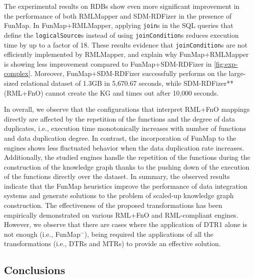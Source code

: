 The experimental results on RDBs show even more significant improvement in the performance of both RMLMapper and SDM-RDFizer in the presence of FunMap. In FunMap+RMLMapper, applying \verb|join|s in the SQL queries that define the \verb|logicalSource|s instead of using \verb|joinCondition|s reduces execution time by up to a factor of 18. These results evidence that \verb|joinCondition|s are not efficiently implemented by RMLMapper, and explain why FunMap+RMLMapper is showing less improvement compared to FunMap+SDM-RDFizer in \autoref{fig:exp-complex}. Moreover, FunMap+SDM-RDFizer successfully performs on the large-sized relational dataset of 1.3GB in 5,670.67 seconds, while SDM-RDFizer**(RML+FnO) cannot create the KG and times out after 10,000 seconds.

In overall, we observe that the configurations that interpret RML+FnO mappings directly are affected by the repetition of the functions and the degree of data duplicates, i.e., execution time monotonically increases with number of functions and data duplication degree. In contrast, the incorporation of FunMap to the engines shows less fluctuated behavior when the data duplication rate increases. Additionally, the studied engines handle the repetition of the functions during the construction of the knowledge graph thanks to the pushing down of the execution of the functions directly over the dataset.
In summary, the observed results indicate that the FunMap heuristics improve the performance of data integration systems and generate solutions to the problem of scaled-up knowledge graph construction. The effectiveness of the proposed transformations has been empirically demonstrated on various RML+FnO and RML-compliant engines. However, we observe that there are cases where the application of DTR1 alone is not enough (i.e., FunMap$^-$), being required the applications of all the transformations (i.e., DTRs and MTRs) to provide an effective solution. 


\subsection{Conclusions}

